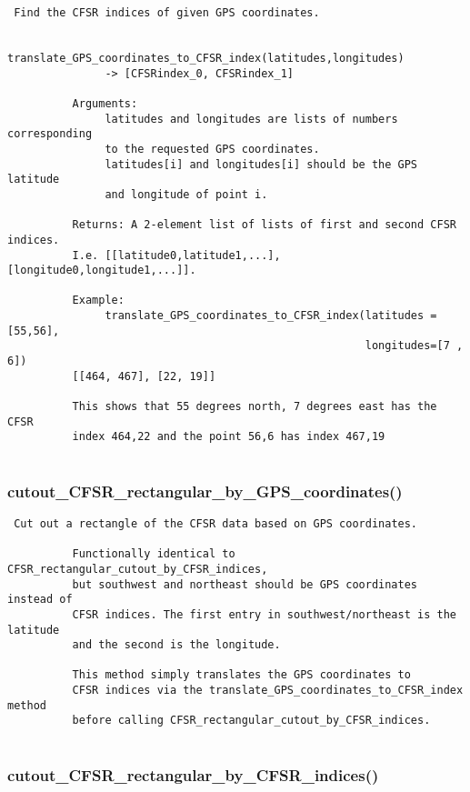 \begin{verbatim}
 Find the CFSR indices of given GPS coordinates.
          
          translate_GPS_coordinates_to_CFSR_index(latitudes,longitudes)
               -> [CFSRindex_0, CFSRindex_1]

          Arguments:
               latitudes and longitudes are lists of numbers corresponding
               to the requested GPS coordinates.
               latitudes[i] and longitudes[i] should be the GPS latitude
               and longitude of point i.

          Returns: A 2-element list of lists of first and second CFSR indices.
          I.e. [[latitude0,latitude1,...], [longitude0,longitude1,...]]. 
          
          Example:
               translate_GPS_coordinates_to_CFSR_index(latitudes =[55,56],
                                                       longitudes=[7 , 6])
          [[464, 467], [22, 19]]

          This shows that 55 degrees north, 7 degrees east has the CFSR
          index 464,22 and the point 56,6 has index 467,19
          
\end{verbatim}
\subsubsection{cutout\_CFSR\_rectangular\_by\_GPS\_coordinates()}


\begin{verbatim}
 Cut out a rectangle of the CFSR data based on GPS coordinates.
          
          Functionally identical to CFSR_rectangular_cutout_by_CFSR_indices,
          but southwest and northeast should be GPS coordinates instead of 
          CFSR indices. The first entry in southwest/northeast is the latitude
          and the second is the longitude.
         
          This method simply translates the GPS coordinates to
          CFSR indices via the translate_GPS_coordinates_to_CFSR_index method
          before calling CFSR_rectangular_cutout_by_CFSR_indices.
          
\end{verbatim}
\subsubsection{cutout\_CFSR\_rectangular\_by\_CFSR\_indices()}



